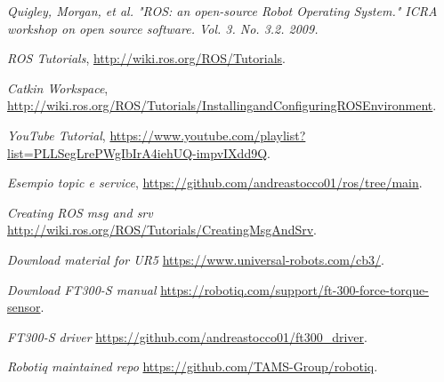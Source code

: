 \begin{thebibliography}{99}

 \textit{Quigley, Morgan, et al. "ROS: an open-source Robot Operating System." ICRA workshop on open source software. 
Vol. 3. No. 3.2. 2009.}

 \textit{ROS Tutorials}, \url{http://wiki.ros.org/ROS/Tutorials}.

 \textit{Catkin Workspace}, \url{http://wiki.ros.org/ROS/Tutorials/InstallingandConfiguringROSEnvironment}.

 \textit{YouTube Tutorial}, \url{https://www.youtube.com/playlist?list=PLLSegLrePWgIbIrA4iehUQ-impvIXdd9Q}.

 \textit{Esempio topic e service}, \url{https://github.com/andreastocco01/ros/tree/main}.

 \textit{Creating ROS msg and srv} \url{http://wiki.ros.org/ROS/Tutorials/CreatingMsgAndSrv}.

 \textit{Download material for UR5} \url{https://www.universal-robots.com/cb3/}.

 \textit{Download FT300-S manual} \url{https://robotiq.com/support/ft-300-force-torque-sensor}.

 \textit{FT300-S driver} \url{https://github.com/andreastocco01/ft300_driver}.

 \textit{Robotiq maintained repo} \url{https://github.com/TAMS-Group/robotiq}.
\end{thebibliography}